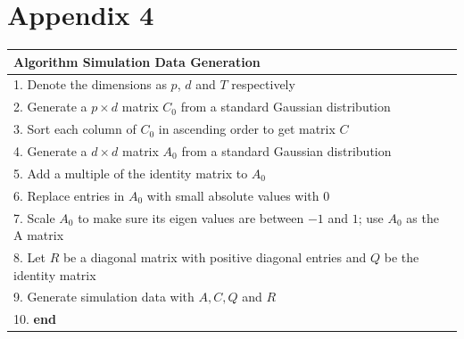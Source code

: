 \documentclass[fleqn]{article}
\begin{document}
\section*{Appendix 4}
\label{sec:appendix4}
\begin{tabular}{l}
\hline
\textbf{Algorithm } Simulation Data Generation\\
\hline
 1. Denote the dimensions as $p$, $d$ and $T$ respectively\\
 2. Generate a $p\times d$ matrix $C_0$ from a standard Gaussian distribution\\
 3. Sort each column of $C_0$ in ascending order to get matrix $C$ \\
 4. Generate a $d\times d$ matrix $A_0$ from a standard Gaussian distribution\\
 5. Add a multiple of the identity matrix to $A_0$\\
 6.	Replace entries in $A_0$ with small absolute values with $0$\\
 7.	Scale $A_0$ to make sure its eigen values are between $-1$ and $1$; use $A_0$ as the A matrix\\
 8.	Let $R$ be a diagonal matrix with positive diagonal entries and $Q$ be the identity matrix \\
 9. Generate simulation data with $A, C, Q$ and $R$ \\
 10. \textbf{end}\\
\hline
\end{tabular}

\newpage


\end{document}

